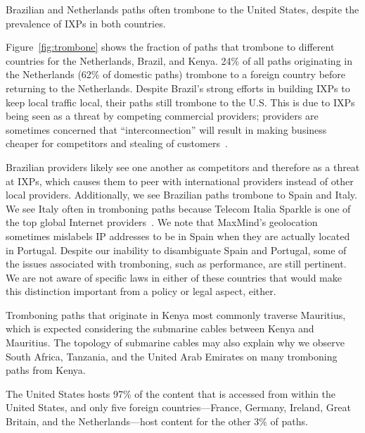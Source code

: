 \begin{finding}
Brazilian and Netherlands paths often trombone to the United States, despite the prevalence of IXPs in both countries.
\end{finding}
\noindent
Figure~\ref{fig:trombone}
shows the fraction of paths that trombone to
different countries for the Netherlands, Brazil, and Kenya. 24\% of
all paths originating in the Netherlands (62\% of domestic paths)
trombone to a foreign country before returning to the
Netherlands. Despite Brazil's strong efforts in building IXPs to keep
local traffic local, 
their paths still trombone to the U.S.  This is due to IXPs being seen
as a threat by competing commercial providers; providers are sometimes
concerned that ``interconnection'' will result in making business
cheaper for competitors and stealing of customers~\cite{ixp_policy}.

Brazilian providers likely see one another as competitors and therefore as a
threat at IXPs, which causes them to peer with international providers instead
of other local providers.  Additionally, we see Brazilian paths trombone to
Spain and Italy.  We see Italy often in tromboning paths because Telecom
Italia Sparkle is one of the top global Internet providers~\cite{bakers}. We
note that MaxMind's geolocation sometimes mislabels IP addresses to be in
Spain when they are actually located in Portugal.  Despite our inability to
disambiguate Spain and Portugal, some of the issues associated with tromboning,
such as performance, are still pertinent. We are not aware of specific laws in
either of these countries that would make this distinction important from a
policy or legal aspect, either.

Tromboning paths that originate in Kenya most commonly traverse Mauritius,
which is expected considering the submarine cables between Kenya and
Mauritius.  The topology of submarine cables may also explain why we observe
South Africa, Tanzania, and the United Arab Emirates on many tromboning paths
from Kenya.


\begin{finding}
The United States hosts 97\% of the content that is accessed from within the United States, and only five foreign countries---France, Germany, Ireland, Great Britain, and the Netherlands---host content for the other 3\% of paths.
\end{finding}
\noindent

